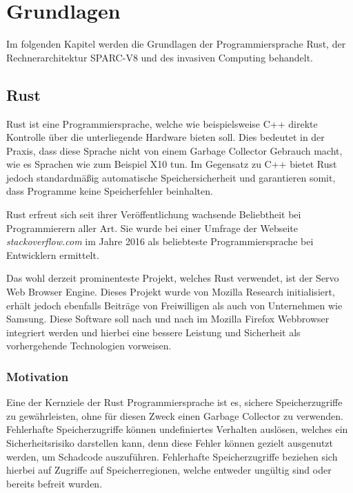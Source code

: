 \chapter{Grundlagen}\label{sec:basics}

Im folgenden Kapitel werden die Grundlagen der Programmiersprache Rust, der Rechnerarchitektur SPARC-V8 und des 
invasiven Computing behandelt.

\section{Rust}

Rust ist eine Programmiersprache, welche wie beispielsweise C++ direkte Kontrolle über die
unterliegende Hardware bieten soll. Dies bedeutet in der Praxis, dass diese Sprache nicht von einem Garbage
Collector Gebrauch macht, wie es Sprachen wie zum Beispiel X10 tun. Im Gegensatz zu C++ bietet Rust jedoch
standardmäßig automatische Speichersicherheit und garantieren somit, dass Programme keine Speicherfehler beinhalten.
\cite{theRustLanguage}

Rust erfreut sich seit ihrer Veröffentlichung wachsende Beliebtheit bei Programmierern aller Art. Sie wurde
bei einer Umfrage der Webseite \textit{stackoverflow.com} im Jahre 2016 als beliebteste Programmiersprache bei 
Entwicklern ermittelt\cite{stackoverflowSurvey}.

Das wohl derzeit prominenteste Projekt, welches Rust verwendet, ist der Servo Web Browser Engine. Dieses Projekt
wurde von Mozilla Research initialisiert, erhält jedoch ebenfalls Beiträge von Freiwilligen
als auch von Unternehmen wie Samsung.
Diese Software soll nach und nach im Mozilla Firefox Webbrowser integriert werden und hierbei eine bessere
Leistung und Sicherheit als vorhergehende Technologien vorweisen\cite{engineeringServo}.

\subsection{Motivation}

Eine der Kernziele der Rust Programmiersprache ist es, sichere Speicherzugriffe zu gewährleisten, ohne
für diesen Zweck einen Garbage Collector zu verwenden. Fehlerhafte Speicherzugriffe können undefiniertes
Verhalten auslösen, welches ein Sicherheitsrisiko darstellen kann, denn diese Fehler können gezielt ausgenutzt
werden, um Schadcode auszuführen. Fehlerhafte Speicherzugriffe beziehen sich hierbei auf Zugriffe auf
Speicherregionen, welche entweder ungültig sind oder bereits befreit wurden.\cite{engineeringServo}\cite{undefinedBehaviour}

